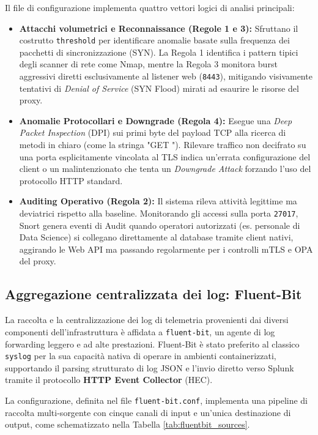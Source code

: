 Il file di configurazione implementa quattro vettori logici di analisi principali:
\begin{itemize}
    \item \textbf{Attacchi volumetrici e Reconnaissance (Regole 1 e 3):} Sfruttano il costrutto \texttt{threshold} per identificare anomalie basate sulla frequenza dei pacchetti di sincronizzazione (SYN). La Regola 1 identifica i pattern tipici degli scanner di rete come Nmap, mentre la Regola 3 monitora burst aggressivi diretti esclusivamente al listener web (\texttt{8443}), mitigando visivamente tentativi di \textit{Denial of Service} (SYN Flood) mirati ad esaurire le risorse del proxy.
    \item \textbf{Anomalie Protocollari e Downgrade (Regola 4):} Esegue una \textit{Deep Packet Inspection} (DPI) sui primi byte del payload TCP alla ricerca di metodi in chiaro (come la stringa "GET "). Rilevare traffico non decifrato su una porta esplicitamente vincolata al TLS indica un'errata configurazione del client o un malintenzionato che tenta un \textit{Downgrade Attack} forzando l'uso del protocollo HTTP standard.
    \item \textbf{Auditing Operativo (Regola 2):} Il sistema rileva attività legittime ma deviatrici rispetto alla baseline. Monitorando gli accessi sulla porta \texttt{27017}, Snort genera eventi di Audit quando operatori autorizzati (es. personale di Data Science) si collegano direttamente al database tramite client nativi, aggirando le Web API ma passando regolarmente per i controlli mTLS e OPA del proxy.
\end{itemize}

\subsection{Aggregazione centralizzata dei log: Fluent-Bit}
La raccolta e la centralizzazione dei log di telemetria provenienti dai diversi componenti dell'infrastruttura è affidata a \texttt{fluent-bit}, un agente di log forwarding leggero e ad alte prestazioni. Fluent-Bit è stato preferito al classico \texttt{syslog} per la sua capacità nativa di operare in ambienti containerizzati, supportando il parsing strutturato di log JSON e l'invio diretto verso Splunk tramite il protocollo \textbf{HTTP Event Collector} (HEC).

La configurazione, definita nel file \texttt{fluent-bit.conf}, implementa una pipeline di raccolta multi-sorgente con cinque canali di input e un'unica destinazione di output, come schematizzato nella Tabella \ref{tab:fluentbit_sources}.

